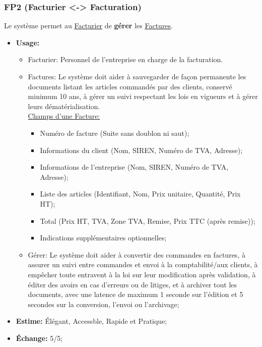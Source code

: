 \documentclass{article}
\begin{document}
\subsubsection{FP2 (Facturier <-> Facturation)}\label{cat:fp2}
Le système permet au \uline{Facturier} de \textbf{gérer} les \uline{Factures}.
\begin{itemize}
	\item \textbf{Usage:} \begin{itemize}
		\item Facturier: Personnel de l'entreprise en charge de la facturation.
		\item Factures: Le système doit aider à sauvegarder de façon permanente
			  les documents listant les articles commandés par des clients,
			  conservé minimum 10 ans, à gérer un suivi respectant les lois en
			  vigueurs et à gérer leurs dématérialisation.\\
			  \uline{Champs d'une Facture:}
			  \begin{itemize}
				\item Numéro de facture (Suite sans doublon ni saut);
				\item Informations du client (Nom, SIREN, Numéro de TVA,
					  Adresse);
				\item Informations de l'entreprise (Nom, SIREN, Numéro de TVA,
					  Adresse);
				\item Liste des articles (Identifiant, Nom, Prix unitaire,
					  Quantité, Prix HT);
				\item Total (Prix HT, TVA, Zone TVA, Remise, Prix TTC (après
					  remise));
				\item Indications supplémentaires optionnelles;
			  \end{itemize}
		\item Gérer: Le système doit aider à convertir des commandes en
			  factures, à assurer un suivi entre commandes et envoi à la
			  comptabilité/aux clients, à empêcher toute entravent à la loi sur
			  leur modification après validation, à éditer des avoirs en cas
			  d'erreurs ou de litiges, et à archiver tout les documents, avec
			  une latence de maximum 1 seconde sur l'édition et 5 secondes sur
			  la conversion, l'envoi ou l'archivage;
	\end{itemize}
	\item \textbf{Estime:} Élégant, Accessble, Rapide et Pratique;
	\item \textbf{Échange:} 5/5;
\end{itemize}
\end{document}
